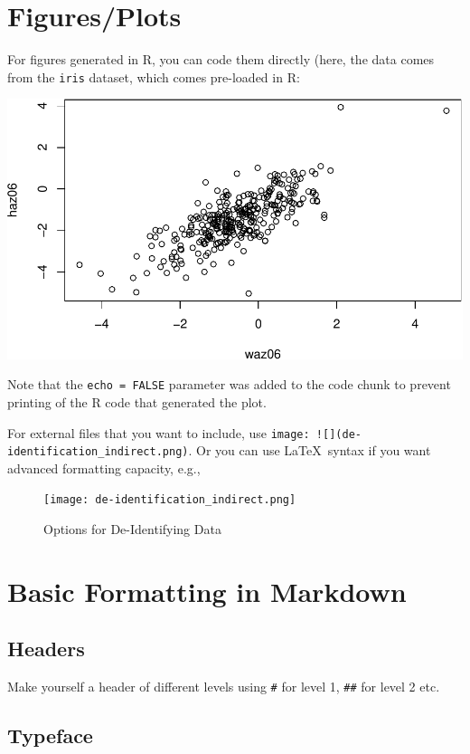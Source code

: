 \documentclass[11pt,]{article}
\begin{document}
\section{Figures/Plots}\label{figuresplots}

For figures generated in R, you can code them directly (here, the data
comes from the \texttt{iris} dataset, which comes pre-loaded in R:

\includegraphics{Rmarkdown_advanced_files/figure-latex/unnamed-chunk-5-1.pdf}

Note that the \texttt{echo\ =\ FALSE} parameter was added to the code
chunk to prevent printing of the R code that generated the plot.

For external files that you want to include, use
\texttt{image:\ !{[}{]}(de-identification\_indirect.png)}. Or you can
use \LaTeX~syntax if you want advanced formatting capacity, e.g.,

\begin{figure}[H]
  \centering
  \caption{Options for De-Identifying Data}
  \texttt{[image: de-identification\_indirect.png]}
\end{figure}

\section{Basic Formatting in
Markdown}\label{basic-formatting-in-markdown}

\subsection{Headers}\label{headers}

Make yourself a header of different levels using \texttt{\#} for level
1, \texttt{\#\#} for level 2 etc.

\subsection{Typeface}\label{typeface}
\end{document}
